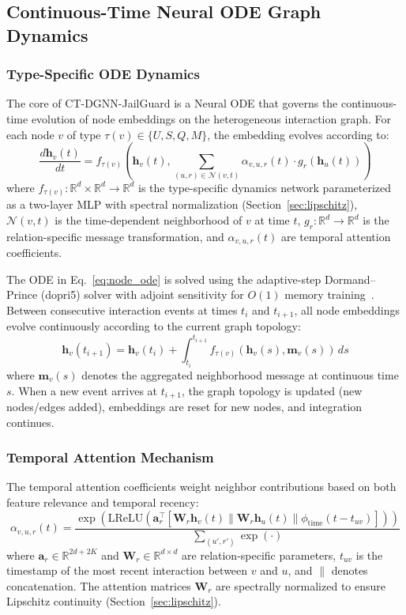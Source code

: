 \documentclass[journal]{IEEEtran}
\newcommand{\R}{\mathbb{R}}
\newcommand{\calN}{\mathcal{N}}
\theoremstyle{plain}
\theoremstyle{definition}
\theoremstyle{remark}
\begin{document}
\subsection{Continuous-Time Neural ODE Graph Dynamics}

\subsubsection{Type-Specific ODE Dynamics}

The core of CT-DGNN-JailGuard is a Neural ODE that governs the continuous-time evolution of node embeddings on the heterogeneous interaction graph. For each node $v$ of type $\tau(v) \in \{U, S, Q, M\}$, the embedding evolves according to:
\begin{equation}
\frac{d\mathbf{h}_v(t)}{dt} = f_{\tau(v)}\!\left(\mathbf{h}_v(t), \sum_{(u,r) \in \calN(v,t)} \alpha_{v,u,r}(t) \cdot g_r(\mathbf{h}_u(t))\right)
\label{eq:node_ode}
\end{equation}
where $f_{\tau(v)}: \R^d \times \R^d \to \R^d$ is the type-specific dynamics network parameterized as a two-layer MLP with spectral normalization (Section~\ref{sec:lipschitz}), $\calN(v,t)$ is the time-dependent neighborhood of $v$ at time $t$, $g_r: \R^d \to \R^d$ is the relation-specific message transformation, and $\alpha_{v,u,r}(t)$ are temporal attention coefficients.

The ODE in Eq.~\eqref{eq:node_ode} is solved using the adaptive-step Dormand--Prince (dopri5) solver with adjoint sensitivity for $O(1)$ memory training~\cite{chen2018neuralode}. Between consecutive interaction events at times $t_i$ and $t_{i+1}$, all node embeddings evolve continuously according to the current graph topology:
\begin{equation}
\mathbf{h}_v(t_{i+1}) = \mathbf{h}_v(t_i) + \int_{t_i}^{t_{i+1}} f_{\tau(v)}(\mathbf{h}_v(s), \mathbf{m}_v(s))\, ds
\end{equation}
where $\mathbf{m}_v(s)$ denotes the aggregated neighborhood message at continuous time $s$. When a new event arrives at $t_{i+1}$, the graph topology is updated (new nodes/edges added), embeddings are reset for new nodes, and integration continues.

\subsubsection{Temporal Attention Mechanism}

The temporal attention coefficients weight neighbor contributions based on both feature relevance and temporal recency:
\begin{equation}
\alpha_{v,u,r}(t) = \frac{\exp\!\left(\text{LReLU}\!\left(\mathbf{a}_r^\top [\mathbf{W}_r \mathbf{h}_v(t) \| \mathbf{W}_r \mathbf{h}_u(t) \| \phi_{\text{time}}(t - t_{uv})]\right)\right)}{\sum_{(u',r')} \exp(\cdot)}
\end{equation}
where $\mathbf{a}_r \in \R^{2d+2K}$ and $\mathbf{W}_r \in \R^{d \times d}$ are relation-specific parameters, $t_{uv}$ is the timestamp of the most recent interaction between $v$ and $u$, and $\|$ denotes concatenation. The attention matrices $\mathbf{W}_r$ are spectrally normalized to ensure Lipschitz continuity (Section~\ref{sec:lipschitz}).
\end{document}
